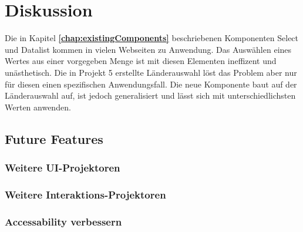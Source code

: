 \chapter{Diskussion}
\label{chap:discussion}

Die in Kapitel \textbf{\ref{chap:existingComponents}} beschriebenen Komponenten Select und Datalist kommen in vielen Webseiten zu Anwendung.
Das Auswählen eines Wertes aus einer vorgegeben Menge ist mit diesen Elementen ineffizent und unästhetisch.
Die in Projekt 5 erstellte Länderauswahl löst das Problem aber nur für diesen einen spezifischen Anwendungsfall.
Die neue Komponente  baut auf der Länderauswahl auf, ist jedoch generalisiert und lässt sich mit unterschiedlichsten Werten anwenden.




\section{Future Features}
\label{sec:future}


\subsection{Weitere UI-Projektoren}
\label{sec:moreUi}


\subsection{Weitere Interaktions-Projektoren}
\label{sec:moreInteraction}


\subsection{Accessability verbessern}
\label{sec:betterAccessability}

